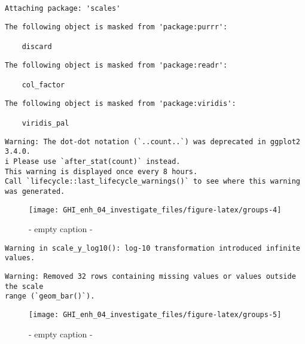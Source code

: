 \documentclass[
  10pt,
  a4paper,oneside]{article}
\begin{document}
\begin{verbatim}
Attaching package: 'scales'
\end{verbatim}

\begin{verbatim}
The following object is masked from 'package:purrr':

    discard
\end{verbatim}

\begin{verbatim}
The following object is masked from 'package:readr':

    col_factor
\end{verbatim}

\begin{verbatim}
The following object is masked from 'package:viridis':

    viridis_pal
\end{verbatim}

\begin{verbatim}
Warning: The dot-dot notation (`..count..`) was deprecated in ggplot2 3.4.0.
i Please use `after_stat(count)` instead.
This warning is displayed once every 8 hours.
Call `lifecycle::last_lifecycle_warnings()` to see where this warning was generated.
\end{verbatim}

\begin{figure}[H]

{\centering \texttt{[image: GHI\_enh\_04\_investigate\_files/figure-latex/groups-4]} 

}

\caption{ - empty caption - }\label{fig:groups-4}
\end{figure}

\begin{verbatim}
Warning in scale_y_log10(): log-10 transformation introduced infinite values.
\end{verbatim}

\begin{verbatim}
Warning: Removed 32 rows containing missing values or values outside the scale
range (`geom_bar()`).
\end{verbatim}

\begin{figure}[H]

{\centering \texttt{[image: GHI\_enh\_04\_investigate\_files/figure-latex/groups-5]} 

}

\caption{ - empty caption - }\label{fig:groups-5}
\end{figure}
\end{document}
